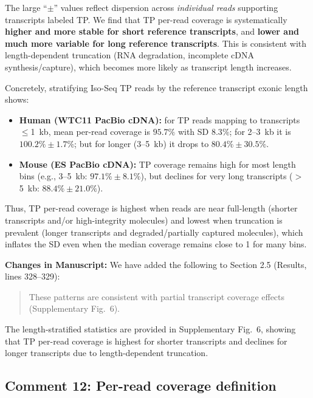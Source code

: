 \documentclass[11pt]{article}
\begin{document}
\begin{responseboxnew}
The large ``$\pm$'' values reflect dispersion across \emph{individual reads} supporting transcripts labeled TP. We find that TP per-read coverage is systematically \textbf{higher and more stable for short reference transcripts}, and \textbf{lower and much more variable for long reference transcripts}. This is consistent with length-dependent truncation (RNA degradation, incomplete cDNA synthesis/capture), which becomes more likely as transcript length increases.

Concretely, stratifying Iso-Seq TP reads by the reference transcript exonic length shows:
\begin{itemize}
    \item \textbf{Human (WTC11 PacBio cDNA):} for TP reads mapping to transcripts $\leq$1~kb, mean per-read coverage is $95.7\%$ with SD $8.3\%$; for 2--3~kb it is $100.2\% \pm 1.7\%$; but for longer (3--5~kb) it drops to $80.4\% \pm 30.5\%$.
    \item \textbf{Mouse (ES PacBio cDNA):} TP coverage remains high for most length bins (e.g., 3--5~kb: $97.1\% \pm 8.1\%$), but declines for very long transcripts ($>$5~kb: $88.4\% \pm 21.0\%$).
\end{itemize}
Thus, TP per-read coverage is highest when reads are near full-length (shorter transcripts and/or high-integrity molecules) and lowest when truncation is prevalent (longer transcripts and degraded/partially captured molecules), which inflates the SD even when the median coverage remains close to 1 for many bins.

\vspace{0.3cm}
\textbf{Changes in Manuscript:} We have added the following to Section 2.5 (Results, lines 328--329):

\begin{quote}
These patterns are consistent with partial transcript coverage effects (Supplementary Fig.~6).
\end{quote}

The length-stratified statistics are provided in Supplementary Fig.~6, showing that TP per-read coverage is highest for shorter transcripts and declines for longer transcripts due to length-dependent truncation.
\end{responseboxnew}

\subsection{Comment 12: Per-read coverage definition}
\end{document}
